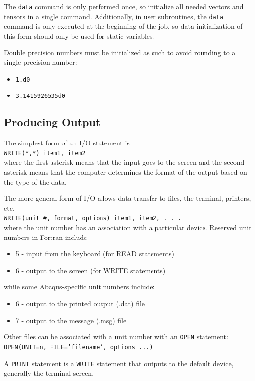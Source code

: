 \documentclass[10pt,letterpaper,oneside]{report}
\begin{document}
\begin{itemize}
The \texttt{data} command is only performed once, so initialize all needed vectors and tensors in a single command.  Additionally, in user subroutines, the \texttt{data} command is only executed at the beginning of the job, so data initialization of this form should only be used for static variables.

Double precision numbers must be initialized as such to avoid rounding to a single precision number: 
\begin{itemize}
\item \texttt{1.d0}
\item \texttt{3.1415926535d0}
\end{itemize}

\subsection{Producing Output}

The simplest form of an I/O statement is \\
\texttt{WRITE(*,*)  item1, item2} \\
where the first asterisk means that the input goes to the screen and the second asterisk means that the computer determines the format of the output based on the type of the data.

The more general form of I/O allows data transfer to files, the terminal, printers, etc.\\
\texttt{WRITE(unit \#, format, options) item1, item2, . . . } \\
where the unit number has an association with a particular device.  Reserved unit numbers in Fortran include
\begin{itemize}
\item 5 - input from the keyboard (for READ statements)
\item 6 - output to the screen (for WRITE statements)
\end{itemize}
while some Abaqus-specific unit numbers include:
\begin{itemize}
\item 6 - output to the printed output (.dat) file
\item 7 - output to the message (.msg) file
\end{itemize}
Other files can be associated with a unit number with an \texttt{OPEN} statement: \\
\texttt{OPEN(UNIT=n, FILE='filename', options ...)}

A \texttt{PRINT} statement is a \texttt{WRITE} statement that outputs to the default device, generally the terminal screen.  


\end{itemize}
\end{document}
